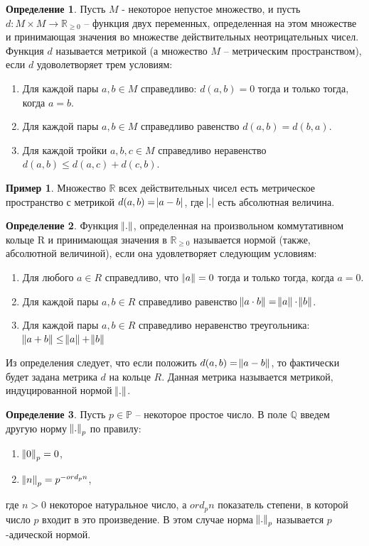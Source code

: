 \documentclass[och, master]{SCWorks}
\theoremstyle{plain}
\theoremstyle{plain}
\theoremstyle{plain}
\theoremstyle{definition}
\newtheorem{defn}{Определение}
\newtheorem{exmp}{Пример}
\begin{document}
\begin{defn}
Пусть $M$ - некоторое непустое множество, и пусть \linebreak ${d: M \times M \rightarrow \mathbb {R}_{\ge0}}$ -- функция двух переменных, определенная на этом множестве и принимающая значения во множестве действительных неотрицательных чисел. Функция $d$ называется метрикой (а множество $M$ -- метрическим пространством), если $d$ удоволетворяет трем условиям:

\begin{enumerate} 
	\item Для каждой пары $a, b \in M$ справедливо: $d(a, b)=0$ тогда и только тогда, когда $a=b$.
	\item Для каждой пары $a, b \in M$ справедливо равенство $d(a, b) = d(b, a)$.
	\item Для каждой тройки $a, b, c \in M$ справедливо неравенство $d(a, b) \le d(a, c) + d(c, b)$.
\end{enumerate}
\end{defn}

\begin{exmp}
Множество $\mathbb {R}$ всех действительных чисел есть метрическое пространство с метрикой $d(a, b)= \abs{a-b}$, где $\abs{.}$ есть абсолютная величина.
\end{exmp}


\begin{defn}
Функция $\norm{.}$, определенная на произвольном коммутативном кольце R и принимающая значения в $\mathbb {R}_{\ge 0}$ называется нормой (также, абсолютной величиной), если она удовлетворяет следующим условиям:

\begin{enumerate} 
	\item Для любого $a \in R$ справедливо, что $\norm{a}=0$ тогда и только тогда, когда $a=0$.
	\item Для каждой пары $a, b \in R$ справедливо равенство $\norm{a \cdot b} = \norm{a} \cdot \norm{b}$.
	\item Для каждой пары $a, b \in R$ справедливо неравенство треугольника: $\norm{a + b} \le \norm{a} + \norm{b}$
\end{enumerate}
\end{defn}

Из определения следует, что если положить $d(a, b)= \norm{a - b}$, то фактически будет задана метрика $d$ на кольце $R$. Данная метрика называется метрикой, индуцированной нормой $\norm{.}$.

\begin{defn}
Пусть $p \in \mathbb {P}$ -- некоторое простое число. В поле $\mathbb {Q}$ введем другую норму $\norm{.}_p$ по правилу:

\begin{enumerate} 
	\item $\norm{0}_p = 0$,
	\item $\norm{n}_p = p ^ {-ord_pn}$,
\end{enumerate}

\noindent где $n > 0$ некоторое натуральное число, а $ord_pn$ показатель степени, в которой число $p$ входит в это произведение. В этом случае норма $\norm{.}_p$ называется $p$-адической нормой.
\end{defn}
\end{document}
